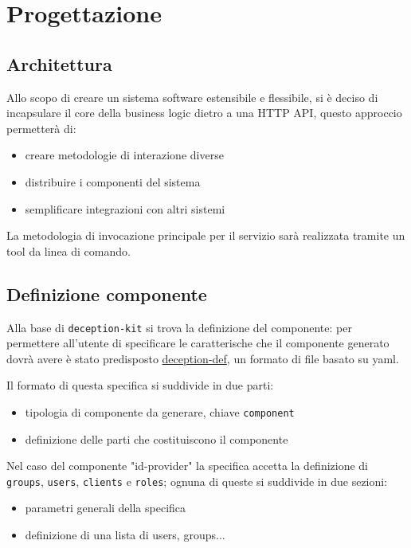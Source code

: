 \section{Progettazione}

\subsection{Architettura}

Allo scopo di creare un sistema software estensibile e flessibile, si è deciso di incapsulare il core della business logic dietro a una HTTP API, questo approccio permetterà di:
\begin{itemize}
    \item creare metodologie di interazione diverse
    \item distribuire i componenti del sistema
    \item semplificare integrazioni con altri sistemi
\end{itemize}

La metodologia di invocazione principale per il servizio sarà realizzata tramite un tool da linea di comando.

\subsection{Definizione componente}

Alla base di \texttt{deception-kit} si trova la definizione del componente: per permettere all'utente di specificare le caratterische che il componente generato dovrà avere è stato predisposto \underline{deception-def}, un formato di file basato su yaml.

Il formato di questa specifica si suddivide in due parti:
\begin{itemize}
    \item tipologia di componente da generare, chiave \texttt{component}
    \item definizione delle parti che costituiscono il componente
\end{itemize}

Nel caso del componente "id-provider" la specifica accetta la definizione di \texttt{groups}, \texttt{users}, \texttt{clients} e \texttt{roles}; ognuna di queste si suddivide in due sezioni:
\begin{itemize}
    \item parametri generali della specifica
    \item definizione di una lista di users, groups...
\end{itemize}

